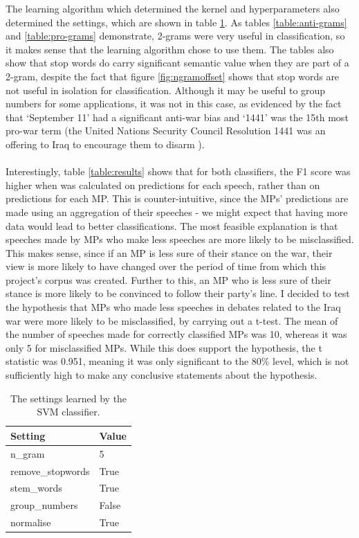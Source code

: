 \documentclass[12pt,a4paper,twoside,openright]{report}
\begin{document}
The learning algorithm which determined the kernel and hyperparameters also determined the settings, which are shown in table \ref{table:settings}. As tables \ref{table:anti-grams} and \ref{table:pro-grams} demonstrate, 2-grams were very useful in classification, so it makes sense that the learning algorithm chose to use them. The tables also show that stop words do carry significant semantic value when they are part of a 2-gram, despite the fact that figure \ref{fig:ngramoffset} shows that stop words are not useful in isolation for classification. Although it may be useful to group numbers for some applications, it was not in this case, as evidenced by the fact that `September 11' had a significant anti-war bias and `1441' was the 15th most pro-war term (the United Nations Security Council Resolution 1441 was an offering to Iraq to encourage them to disarm \cite{resolution}).
\\\\
Interestingly, table \ref{table:results} shows that for both classifiers, the F1 score was higher when was calculated on predictions for each speech, rather than on predictions for each MP. This is counter-intuitive, since the MPs' predictions are made using an aggregation of their speeches - we might expect that having more data would lead to better classifications. The most feasible explanation is that speeches made by MPs who make less speeches are more likely to be misclassified. This makes sense, since if an MP is less sure of their stance on the war, their view is more likely to have changed over the period of time from which this project's corpus was created. Further to this, an MP who is less sure of their stance is more likely to be convinced to follow their party's line. I decided to test the hypothesis that MPs who made less speeches in debates related to the Iraq war were more likely to be misclassified, by carrying out a t-test. The mean of the number of speeches made for correctly classified MPs was 10, whereas it was only 5 for misclassified MPs. While this does support the hypothesis, the t statistic was 0.951, meaning it was only significant to the 80\% level, which is not sufficiently high to make any conclusive statements about the hypothesis.

\begin{table}[]
	\centering
	\begin{tabular}{ll}
		\hline
		\textbf{Setting}  & \textbf{Value} \\ \hline
		n\_gram           & 5              \\ 
		remove\_stopwords & True           \\
		stem\_words       & True           \\
		group\_numbers    & False          \\
		normalise         & True           \\
		\hline
	\end{tabular}
	\caption{The settings learned by the SVM classifier.}
	\label{table:settings}	
\end{table}
\end{document}
